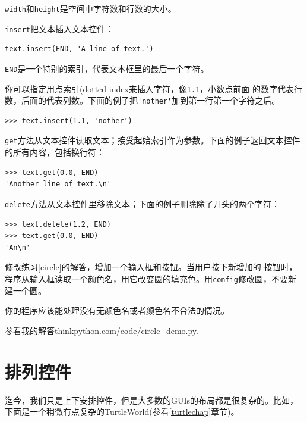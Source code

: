 {\tt width}和{\tt height}是空间中字符数和行数的大小。

{\tt insert}把文本插入文本控件：

\beforeverb
\begin{verbatim}
text.insert(END, 'A line of text.')
\end{verbatim}
\afterverb
%

{\tt END}是一个特别的索引，代表文本框里的最后一个字符。

你可以指定用点索引(dotted index来插入字符，像{\tt 1.1}，小数点前面
的数字代表行数，后面的代表列数。下面的例子把\verb"'nother'"加到第一行第一个字符之后。

\beforeverb
\begin{verbatim}
>>> text.insert(1.1, 'nother')
\end{verbatim}
\afterverb

{\tt get}方法从文本控件读取文本；接受起始索引作为参数。下面的例子返回文本控件的所有内容，包括换行符：

\beforeverb
\begin{verbatim}
>>> text.get(0.0, END)
'Another line of text.\n'
\end{verbatim}
\afterverb
%

{\tt delete}方法从文本控件里移除文本；下面的例子删除除了开头的两个字符：

\beforeverb
\begin{verbatim}
>>> text.delete(1.2, END)
>>> text.get(0.0, END)
'An\n'
\end{verbatim}
\afterverb
%

\begin{ex}
\label{circle2}

修改练习\ref{circle}的解答，增加一个输入框和按钮。当用户按下新增加的
按钮时，程序从输入框读取一个颜色名，用它改变圆的填充色。用{\tt config}修改圆，不要新建一个圆。

你的程序应该能处理没有无颜色名或者颜色名不合法的情况。

参看我的解答\url{thinkpython.com/code/circle_demo.py}.

\end{ex}

\section{排列控件}

迄今，我们只是上下安排控件，但是大多数的GUIs的布局都是很复杂的。比如，下面是一个稍微有点复杂的TurtleWorld(参看\ref{turtlechap}章节)。

